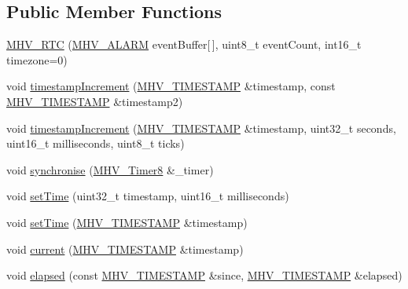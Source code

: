 \subsection*{\-Public \-Member \-Functions}
\begin{DoxyCompactItemize}
\item 
\hyperlink{class_m_h_v___r_t_c_aacb9ee506e1e18672a821b44f5138d2b}{\-M\-H\-V\-\_\-\-R\-T\-C} (\hyperlink{_m_h_v___r_t_c_8h_af13307658f41fba330ffae04dd5cbce6}{\-M\-H\-V\-\_\-\-A\-L\-A\-R\-M} event\-Buffer\mbox{[}$\,$\mbox{]}, uint8\-\_\-t event\-Count, int16\-\_\-t timezone=0)
\item 
void \hyperlink{class_m_h_v___r_t_c_a666d907f0699c61337891adb040d5114}{timestamp\-Increment} (\hyperlink{_m_h_v___r_t_c_8h_a1e30d3a92b1b868286bd0d619245d8a6}{\-M\-H\-V\-\_\-\-T\-I\-M\-E\-S\-T\-A\-M\-P} \&timestamp, const \hyperlink{_m_h_v___r_t_c_8h_a1e30d3a92b1b868286bd0d619245d8a6}{\-M\-H\-V\-\_\-\-T\-I\-M\-E\-S\-T\-A\-M\-P} \&timestamp2)
\item 
void \hyperlink{class_m_h_v___r_t_c_a286a1504182064b5f8168669ac5f46c1}{timestamp\-Increment} (\hyperlink{_m_h_v___r_t_c_8h_a1e30d3a92b1b868286bd0d619245d8a6}{\-M\-H\-V\-\_\-\-T\-I\-M\-E\-S\-T\-A\-M\-P} \&timestamp, uint32\-\_\-t seconds, uint16\-\_\-t milliseconds, uint8\-\_\-t ticks)
\item 
void \hyperlink{class_m_h_v___r_t_c_a97308259a62550d63eaf677190fa5581}{synchronise} (\hyperlink{class_m_h_v___timer8}{\-M\-H\-V\-\_\-\-Timer8} \&\-\_\-timer)
\item 
void \hyperlink{class_m_h_v___r_t_c_a426e7a34e8a3957d378a634c2c2d00d8}{set\-Time} (uint32\-\_\-t timestamp, uint16\-\_\-t milliseconds)
\item 
void \hyperlink{class_m_h_v___r_t_c_a9eba3cfa73969390764bea958ed276ab}{set\-Time} (\hyperlink{_m_h_v___r_t_c_8h_a1e30d3a92b1b868286bd0d619245d8a6}{\-M\-H\-V\-\_\-\-T\-I\-M\-E\-S\-T\-A\-M\-P} \&timestamp)
\item 
void \hyperlink{class_m_h_v___r_t_c_ad01b7a3e8049fb64bf9f490e97b89696}{current} (\hyperlink{_m_h_v___r_t_c_8h_a1e30d3a92b1b868286bd0d619245d8a6}{\-M\-H\-V\-\_\-\-T\-I\-M\-E\-S\-T\-A\-M\-P} \&timestamp)
\item 
void \hyperlink{class_m_h_v___r_t_c_ac29cd961ae085c0b19e439f6a41c2941}{elapsed} (const \hyperlink{_m_h_v___r_t_c_8h_a1e30d3a92b1b868286bd0d619245d8a6}{\-M\-H\-V\-\_\-\-T\-I\-M\-E\-S\-T\-A\-M\-P} \&since, \hyperlink{_m_h_v___r_t_c_8h_a1e30d3a92b1b868286bd0d619245d8a6}{\-M\-H\-V\-\_\-\-T\-I\-M\-E\-S\-T\-A\-M\-P} \&elapsed)
\item 

\end{DoxyCompactItemize}

